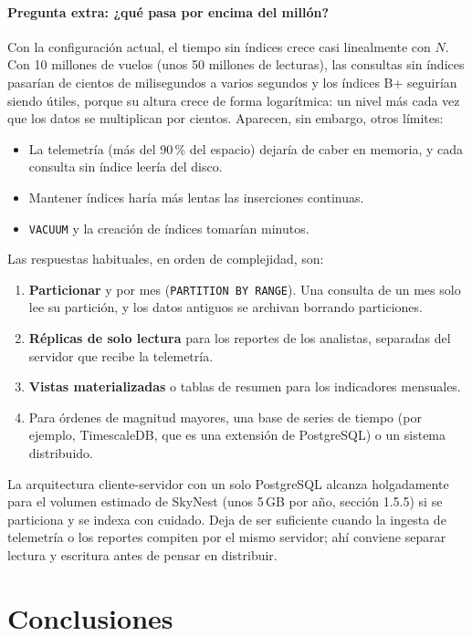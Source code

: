 \paragraph{Pregunta extra: ¿qué pasa por encima del millón?} Con la configuración actual, el tiempo sin índices crece casi linealmente con $N$. Con 10 millones de vuelos (unos 50 millones de lecturas), las consultas sin índices pasarían de cientos de milisegundos a varios segundos y los índices B+ seguirían siendo útiles, porque su altura crece de forma logarítmica: un nivel más cada vez que los datos se multiplican por cientos. Aparecen, sin embargo, otros límites:
\begin{itemize}
\item La telemetría (más del 90\,\% del espacio) dejaría de caber en memoria, y cada consulta sin índice leería del disco.
\item Mantener índices haría más lentas las inserciones continuas.
\item \texttt{VACUUM} y la creación de índices tomarían minutos.
\end{itemize}
Las respuestas habituales, en orden de complejidad, son:
\begin{enumerate}[label=\arabic*.]
\item \textbf{Particionar}  y  por mes (\texttt{PARTITION BY RANGE}). Una consulta de un mes solo lee su partición, y los datos antiguos se archivan borrando particiones.
\item \textbf{Réplicas de solo lectura} para los reportes de los analistas, separadas del servidor que recibe la telemetría.
\item \textbf{Vistas materializadas} o tablas de resumen para los indicadores mensuales.
\item Para órdenes de magnitud mayores, una base de series de tiempo (por ejemplo, TimescaleDB, que es una extensión de PostgreSQL) o un sistema distribuido.
\end{enumerate}
La arquitectura cliente-servidor con un solo PostgreSQL alcanza holgadamente para el volumen estimado de SkyNest (unos 5\,GB por año, sección 1.5.5) si se particiona y se indexa con cuidado. Deja de ser suficiente cuando la ingesta de telemetría o los reportes compiten por el mismo servidor; ahí conviene separar lectura y escritura antes de pensar en distribuir.

\section{Conclusiones}


